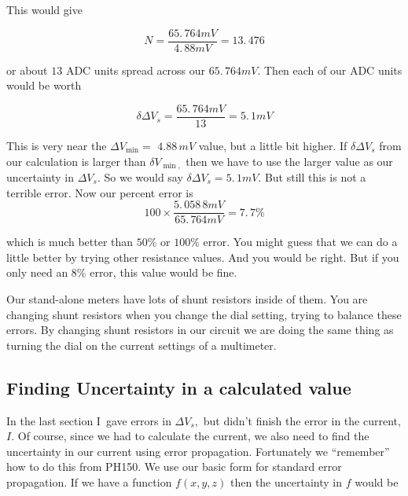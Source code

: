 \noindent This would give 

\begin{equation*}
	N=\frac{65.\,\allowbreak 764\unit{mV}}{4.\,\allowbreak 88\unit{mV}}=13.\,\allowbreak 476
\end{equation*}

\noindent or about $13$ ADC units spread across our $65.\,\allowbreak 764\unit{mV}.$ Then each of our ADC units would be worth 

\begin{equation*}
	\delta \Delta V_{s}=\frac{65.\,\allowbreak 764\unit{mV}}{13}=5.\,\allowbreak1\unit{mV}
\end{equation*}

This is very near the $\Delta V_{\min }=$ $4.88\,\allowbreak \unit{mV}$ value, but a little bit higher. If $\delta \Delta V_{s}$ from our calculation is larger than $\delta V_{\min ,}$ then we have to use the larger value as our uncertainty in $\Delta V_{s}.$ So we would say $\delta \Delta V_{s}=5.\,\allowbreak 1\unit{mV}.$ But still this is not a terrible error.  Now our percent error is
\begin{equation*}
	100\times \frac{5.\,\allowbreak 058\,8\unit{mV}}{65.\,\allowbreak 764\unit{mV}}=7.\,\allowbreak 7\%
\end{equation*}

\noindent which is much better than $50\%$ or $100\%$ error. You might guess that we can do a little better by trying other resistance values. And you would be right. But if you only need an $8\%$ error, this value would be fine.

Our stand-alone meters have lots of shunt resistors inside of them. You are changing shunt resistors when you change the dial setting, trying to balance these errors. By changing shunt resistors in our circuit we are doing the same thing as turning the dial on the current settings of a multimeter.

\subsection{Finding Uncertainty in a calculated value}

In the last section I\ gave errors in $\Delta V_{s},$ but didn't finish the error in the current, $I.$ Of course, since we had to calculate the current, we also need to find the uncertainty in our current using error propagation. Fortunately we ``remember'' how to do this from PH150. We use our basic form for standard error propagation. If we have a function $f\left( x,y,z\right) $ then the uncertainty in $f$ would be 

